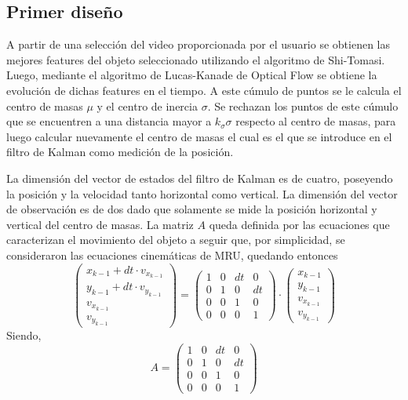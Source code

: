 
\subsection{Primer diseño}

A partir de una selección del video proporcionada por el usuario se obtienen las mejores features del objeto seleccionado utilizando el algoritmo de Shi-Tomasi. Luego, mediante el algoritmo de Lucas-Kanade de Optical Flow se obtiene la evolución de dichas features en el tiempo. A este cúmulo de puntos se le calcula el centro de masas $\mu$ y el centro de inercia $\sigma$. Se rechazan los puntos de este cúmulo que se encuentren a una distancia mayor a $k_{\sigma}\sigma$ respecto al centro de masas, para luego calcular nuevamente el centro de masas el cual es el que se introduce en el filtro de Kalman como medición de la posición.

La dimensión del vector de estados del filtro de Kalman es de cuatro, poseyendo la posición y la velocidad tanto horizontal como vertical. La dimensión del vector de observación es de dos dado que solamente se mide la posición horizontal y vertical del centro de masas. La matriz $A$ queda definida por las ecuaciones que caracterizan el movimiento del objeto a seguir que, por simplicidad, se consideraron las ecuaciones cinemáticas de MRU, quedando entonces
\begin{equation}
\begin{pmatrix} x_{k-1} + dt\cdot v_{x_{k-1}} \\y_{k-1} + dt\cdot v_{y_{k-1}} \\ v_{x_{k-1}}  \\ v_{y_{k-1}} \end{pmatrix} =\begin{pmatrix}
1 & 0 & dt  & 0\\
0 & 1  & 0 & dt\\
0 & 0  & 1  & 0\\
0 & 0  & 0  & 1 
\end{pmatrix} \cdot \begin{pmatrix} x_{k-1}\\y_{k-1} \\ v_{x_{k-1}}  \\ v_{y_{k-1}} \end{pmatrix}
\end{equation}
Siendo, 
\begin{equation}
A = 
\begin{pmatrix}
1 & 0 & dt  & 0\\
0 & 1  & 0 & dt\\
0 & 0  & 1  & 0\\
0 & 0  & 0  & 1 
\end{pmatrix}
\end{equation}

